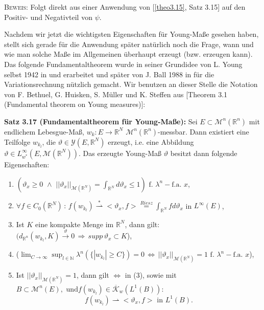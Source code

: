 \textsc{Beweis:} Folgt direkt aus einer Anwendung von [\ref{theo3.15}, Satz 3.15] auf den Positiv- und Negativteil von \(\psi\).\QEDB

Nachdem wir jetzt die wichtigsten Eigenschaften für Young-Maße gesehen haben, stellt sich gerade für die Anwendung später natürlich noch die Frage, wann und wie man solche Maße im Allgemeinen überhaupt erzeugt (bzw. erzeugen kann). Das folgende Fundamentaltheorem wurde in seiner Grundidee von L. Young selbst 1942 in \cite{young1942generalized} und \cite{youngII1942generalized} erarbeitet und später von J. Ball 1988 in \cite{ball2005version} für die Variationsrechnung nützlich gemacht. Wir benutzen an dieser Stelle die Notation von F. Bethuel, G. Huisken, S. Müller und K. Steffen aus \cite{bethuel1999variational}[Theorem 3.1 (Fundamental theorem on Young measures)]:\\[0.5cm]
\colorbox{generalYellow}{\begin{minipage}{16cm}{\textcolor{black}{}{\label{theo3.17}}}
\textbf{Satz 3.17 (Fundamentaltheorem für Young-Maße):} Sei \(E \subset \mathcal{M}^n(\mathbb{R}^n)\) mit endlichem Lebesgue-Maß, \(w_k : E \to \mathbb{R}^N\) \(\mathcal{M}^n(\mathbb{R}^n)\)-messbar. Dann existiert eine Teilfolge \(w_{k_l}\), die \(\vartheta \in \mathcal{Y}(E,\mathbb{R}^N)\) erzeugt, i.e. eine Abbildung \(\vartheta \in L^{\infty}_{w^*}(E,\mathcal{M}(\mathbb{R}^N))\). Das erzeugte Young-Maß \(\vartheta\) besitzt dann folgende Eigenschaften:
\begin{enumerate}
    \item \((\vartheta_x \geq 0 \, \, \land \, \, ||\vartheta_x||_{\mathcal{M}(\mathbb{R}^N)} = \int_{\mathbb{R}^N} d\vartheta_x \leq 1) \text{ f. }\lambda^n-\text{f.a. }x\),
    \item \(\forall f \in C_0(\mathbb{R}^N) \, : \, f(w_{k_l}) \stackrel{*}{\rightharpoonup} <\vartheta_x,f> \stackrel{Riesz}{=} \int_{\mathbb{R}^N} fd \vartheta_x\) in \(L^{\infty}(E)\),
    \item Ist \(K\) eine kompakte Menge im \(\mathbb{R}^N\), dann gilt: \((d_{\mathbb{R}^n} (w_{k_l}, K) \stackrel{\vartheta}{\to} 0 \, \Rightarrow \, supp \, \vartheta_x \subset K\)),
    \item (\(\lim_{C \to \infty} \sup_{l \in \mathbb{N}} \lambda^n(\{|w_{k_l}| \geq C\}) = 0 \, \Leftrightarrow \, ||\vartheta_x||_{\mathcal{M}(\mathbb{R}^N)} = 1 \text{ f. }\lambda^n-\text{f.a. }x\)),
    \item Ist \(||\vartheta_x||_{\mathcal{M}(\mathbb{R}^N)} = 1\), dann gilt \(\Leftrightarrow\) in (3), sowie mit \(B \subset \mathcal{M}^n(E), \text{ und} f(w_{k_l}) \in \overline{\mathcal{K}}_w(L^1(B))\):
    \begin{equation}
        f(w_{k_l}) \rightharpoonup <\vartheta_x,f> \text{ in }L^1(B).
    \end{equation}
\end{enumerate}
\end{minipage}}

